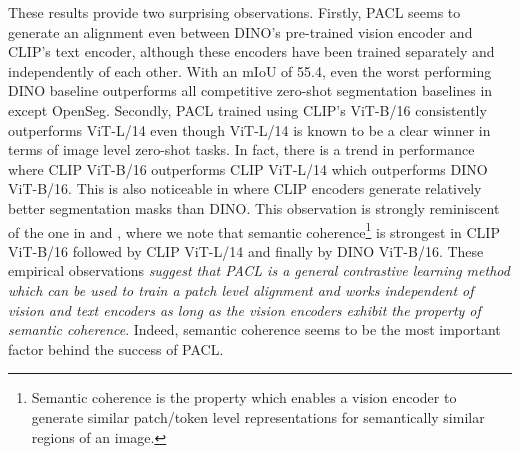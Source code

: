 \documentclass[10pt,twocolumn,letterpaper]{article}
\begin{document}
These results provide two surprising observations. Firstly, PACL seems to generate an alignment even between DINO's pre-trained vision encoder and CLIP's text encoder, although these encoders have been trained separately and independently of each other. With an mIoU of 55.4, even the worst performing DINO baseline outperforms all competitive zero-shot segmentation baselines in  except OpenSeg. Secondly, PACL trained using CLIP's ViT-B/16 consistently outperforms ViT-L/14 even though ViT-L/14 is known to be a clear winner in terms of image level zero-shot tasks. In fact, there is a trend in performance where CLIP ViT-B/16 outperforms CLIP ViT-L/14 which outperforms DINO ViT-B/16. This is also noticeable in  where CLIP encoders generate relatively better segmentation masks than DINO. This observation is strongly reminiscent of the one in  and , where we note that semantic coherence\footnote{Semantic coherence is the property which enables a vision encoder to generate similar patch/token level representations for semantically similar regions of an image.} is strongest in CLIP ViT-B/16 followed by CLIP ViT-L/14 and finally by DINO ViT-B/16. These empirical observations \emph{suggest that PACL is a general contrastive learning method which can be used to train a patch level alignment and works independent of vision and text encoders as long as the vision encoders exhibit the property of semantic coherence}. Indeed, semantic coherence seems to be the most important factor behind the success of PACL.
\end{document}
